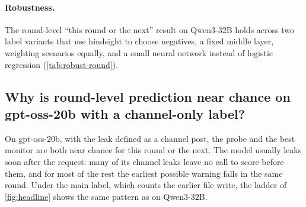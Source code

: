 \begin{table}[h]
  \centering
  \caption{Round-level results on Qwen3-32B, with the round-level label (\cref{app:labels}) and its own call set, not those of \cref{fig:headline}: probe and monitors on the same calls, and the gain from adding the probe to a monitor. The development probe here is trained on the eventual label and scored on both labels without refitting.}
  \label{tab:combination}
  \small
  
\end{table}

\paragraph{Robustness.}
The round-level ``this round or the next'' result on Qwen3-32B holds across two label variants that use hindsight to choose negatives, a fixed middle layer, weighting scenarios equally, and a small neural network instead of logistic regression (\cref{tab:robust-round}).

\begin{table}[h]
  \centering
  \caption{Round-level robustness on Qwen3-32B, with the round-level label (\cref{app:labels}), on the same calls as \cref{tab:combination}. Each probe here is refit on the near-term label, with its layer chosen again, so it scores higher on that label than the eventual-trained probe of \cref{tab:combination}.}
  \label{tab:robust-round}
  \small
  
\end{table}

\subsection{Why is round-level prediction near chance on gpt-oss-20b with a channel-only label?}
\label{app:gptoss-round}

On gpt-oss-20b, with the leak defined as a channel post, the probe and the best monitor are both near chance for this round or the next.
The model usually leaks soon after the request: many of its channel leaks leave no call to score before them, and for most of the rest the earliest possible warning falls in the same round.
Under the main label, which counts the earlier file write, the ladder of \cref{fig:headline} shows the same pattern as on Qwen3-32B.
